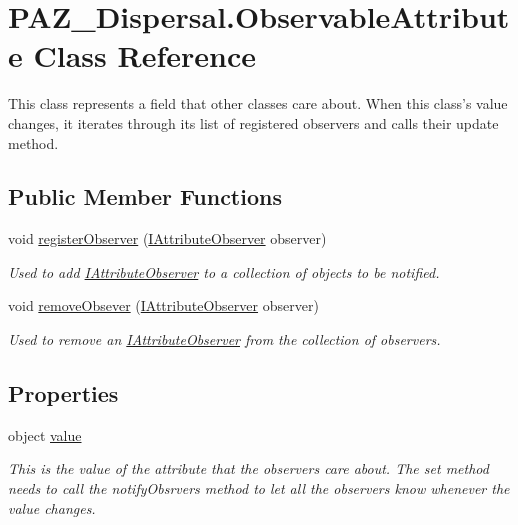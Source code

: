 \hypertarget{class_p_a_z___dispersal_1_1_observable_attribute}{\section{P\-A\-Z\-\_\-\-Dispersal.\-Observable\-Attribute Class Reference}
\label{class_p_a_z___dispersal_1_1_observable_attribute}
}


This class represents a field that other classes care about. When this class's value changes, it iterates through its list of registered observers and calls their update method.  


\subsection*{Public Member Functions}
\begin{DoxyCompactItemize}
\item 
void \hyperlink{class_p_a_z___dispersal_1_1_observable_attribute_ad8c926627740a5433db437fff8d4fadc}{register\-Observer} (\hyperlink{interface_p_a_z___dispersal_1_1_i_attribute_observer}{I\-Attribute\-Observer} observer)
\begin{DoxyCompactList}\small\item\em Used to add \hyperlink{interface_p_a_z___dispersal_1_1_i_attribute_observer}{I\-Attribute\-Observer} to a collection of objects to be notified. \end{DoxyCompactList}\item 
void \hyperlink{class_p_a_z___dispersal_1_1_observable_attribute_a8e38ffdccafbb0cfbd167da56eac254b}{remove\-Obsever} (\hyperlink{interface_p_a_z___dispersal_1_1_i_attribute_observer}{I\-Attribute\-Observer} observer)
\begin{DoxyCompactList}\small\item\em Used to remove an \hyperlink{interface_p_a_z___dispersal_1_1_i_attribute_observer}{I\-Attribute\-Observer} from the collection of observers. \end{DoxyCompactList}\end{DoxyCompactItemize}
\subsection*{Properties}
\begin{DoxyCompactItemize}
\item 
object \hyperlink{class_p_a_z___dispersal_1_1_observable_attribute_aa17717793a294b39a576a598d4a72431}{value}
\begin{DoxyCompactList}\small\item\em This is the value of the attribute that the observers care about. The set method needs to call the notify\-Obsrvers method to let all the observers know whenever the value changes. \end{DoxyCompactList}\end{DoxyCompactItemize}


